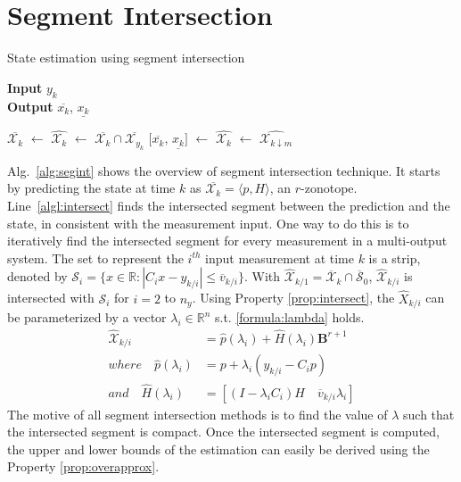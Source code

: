 \section{Segment Intersection} 
\begin{algorithm}[H]
        \caption{State estimation using segment intersection}
        \textbf{Input} $y_k$\\
 		\textbf{Output} $\overline{x_k}$, $\underline{x_k}$
        \begin{algorithmic}[1]
        \State $\overline{\mathcal{X}_k}$ $\gets$ 
        \State $\hat{\mathcal{X}_{k}}$ $\gets$ $\overline{\mathcal{X}_k} \cap \overline{\mathcal{X}_{y_k}}$ \label{algl:intersect}
        \State $[\overline{x_k}$, $\underline{x_k}]$ $\gets$ 
        \State $\hat{\mathcal{X}_{k}}$ $\gets$ $\hat{\mathcal{X}_{k\downarrow m}}$ \label{algl:reduce}
        \end{algorithmic}
        \label{alg:segint}
\end{algorithm}
Alg.~\ref{alg:segint} shows the overview of segment intersection technique. It starts by predicting the state at time $k$ as $\overline{\mathcal{X}_k} = \langle p , H \rangle $, an $r$-zonotope. Line~\ref{algl:intersect} finds the intersected segment between the prediction and the state, in consistent with the measurement input. One way to do this is to iteratively find the intersected segment for every measurement in a multi-output system. The set to represent the $i^{th}$ input measurement at time $k$  is a strip, denoted by $\mathscr{S}_i = \{x \in \mathbb{R} : |C_i x - y_{k/i}| \leq \overline{v}_{k/i}\}$. With $\hat{\mathcal{X}}_{k/1} = \overline{\mathcal{X}}_k \cap \overline{\mathscr{S}}_0$, $\hat{\mathcal{X}}_{k/i}$  is intersected with $\mathscr{S}_i$ for $i=2$ to $n_y$. Using Property \ref{prop:intersect}, the $\hat{X}_{k/i}$ can be parameterized by a vector $\lambda_i \in \mathbb{R}^n$ s.t. \eqref{formula:lambda} holds.
\begin{equation}
\label{formula:lambda}
\begin{split}
\mathcal{\hat{X}}_{k/i} &= \hat{p}(\lambda_i) + \hat{H}(\lambda_i)\textbf{B}^{r+1}  \\
where \quad \hat{p}(\lambda_i) &= p+ \lambda_i(y_{k/i} - C_i p)\\
and \quad \hat{H}(\lambda_i) &= [(I- \lambda_i C_i) H \quad \overline{v}_{k/i} \lambda_i ]
\end{split}
\end{equation}
The motive of all segment intersection methods is to find the value of $\lambda$ such that the intersected segment is compact. Once the intersected segment is computed, the upper and lower bounds of the estimation can easily be derived using the Property \ref{prop:overapprox}.

